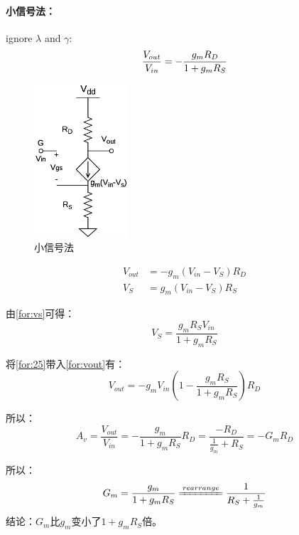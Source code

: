 \documentclass[twoside,a4paper,openright,titlepage,draft]{ctexrep}
\begin{document}
\paragraph{小信号法：}
ignore $\lambda$ and $\gamma$: 
\begin{equation}
    \frac{V_{out}}{V_{in}}=-\frac{g_mR_D}{1+g_mR_S} \notag
\end{equation}
\begin{multicols}{2}
    \begin{figure}[H]
        \centering
        \includegraphics[width=35mm]{sourcedegenerationsmallsignal.eps}
        \caption{小信号法}
        \label{fig:小信号法}
    \end{figure}
    \columnbreak
    \begin{align}
        V_{out} &= -g_m(V_{in} - V_S)R_D \label{for:vout} \\
        V_S &= g_m(V_{in} - V_S)R_S \label{for:vs}
    \end{align}
\end{multicols}

由\ref{for:vs}可得：
\begin{equation}
    V_S = \frac{g_mR_SV_{in}}{1 + g_mR_S} \label{for:25}
\end{equation}

将\ref{for:25}带入\ref{for:vout}有：
\begin{equation}
    V_{out} = -g_mV_{in}(1 - \frac{g_mR_S}{1 + g_mR_S})R_D
\end{equation}

所以：
\begin{equation}
    A_v = \frac{V_{out}}{V_{in}} = -\frac{g_m}{1 + g_mR_S}R_D = \frac{-R_D}{\frac{1}{g_m} + R_S} = -G_mR_D
\end{equation}

所以：
\begin{equation}
    G_m = \frac{g_m}{1+g_mR_S} \xlongequal{rearrange} \frac{1}{R_S + {1 \over g_m}}
\end{equation}
结论：$G_m$比$g_m$变小了$1 + g_mR_S$倍。
\end{document}
